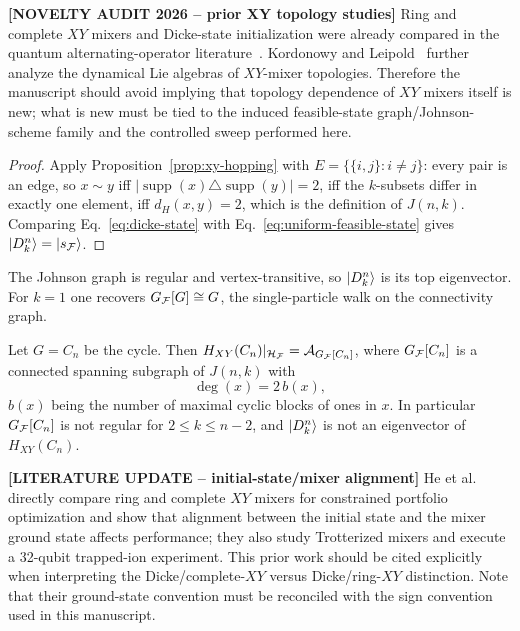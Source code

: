 {\color{red}\textbf{[NOVELTY AUDIT 2026 -- prior XY topology studies]} Ring and complete $XY$ mixers and Dicke-state initialization were already compared in the quantum alternating-operator literature~\cite{Cook2019,Wang2020,He2023}. Kordonowy and Leipold~\cite{Kordonowy2026} further analyze the dynamical Lie algebras of $XY$-mixer topologies. Therefore the manuscript should avoid implying that topology dependence of $XY$ mixers itself is new; what is new must be tied to the induced feasible-state graph/Johnson-scheme family and the controlled sweep performed here.

\begin{proof}
Apply Proposition~\ref{prop:xy-hopping} with $E=\{\{i,j\}:i\neq j\}$: every pair is an edge, so $x\sim y$ iff $|\operatorname{supp}(x)\triangle\operatorname{supp}(y)|=2$, iff the $k$-subsets differ in exactly one element, iff $d_H(x,y)=2$, which is the definition of $J(n,k)$. Comparing Eq.~\eqref{eq:dicke-state} with Eq.~\eqref{eq:uniform-feasible-state} gives $\ket{D^n_k}=\ket{s_{\mathcal{F}}}$.
\end{proof}

\begin{remark} The Johnson graph is regular and vertex-transitive, so
$\ket{D^n_k}$ is its top eigenvector. For $k=1$ one recovers $G_{\mathcal{F}}[G]\cong G$, the single-particle walk on the connectivity graph.
\end{remark}

\begin{corollary}
\label{cor:ring-xy}
Let $G=C_n$ be the cycle. Then $H_{XY}(C_n)|_{\mathcal{H}_{\mathcal{F}}}=\mathcal{A}_{G_{\mathcal{F}}[C_n]}$, where $G_{\mathcal{F}}[C_n]$ is a connected spanning subgraph of $J(n,k)$ with
\begin{equation}
\deg(x)=2\,b(x),
    \label{eq:ring-degree}
\end{equation}
$b(x)$ being the number of maximal cyclic blocks of ones in $x$. In particular $G_{\mathcal{F}}[C_n]$ is not regular for $2\le k\le n-2$, and $\ket{D^n_k}$ is not an eigenvector of $H_{XY}(C_n)$.
\end{corollary}

{\color{red}\textbf{[LITERATURE UPDATE -- initial-state/mixer alignment]} He et al.~\cite{He2023} directly compare ring and complete $XY$ mixers for constrained portfolio optimization and show that alignment between the initial state and the mixer ground state affects performance; they also study Trotterized mixers and execute a 32-qubit trapped-ion experiment. This prior work should be cited explicitly when interpreting the Dicke/complete-$XY$ versus Dicke/ring-$XY$ distinction. Note that their ground-state convention must be reconciled with the sign convention used in this manuscript.}

}
